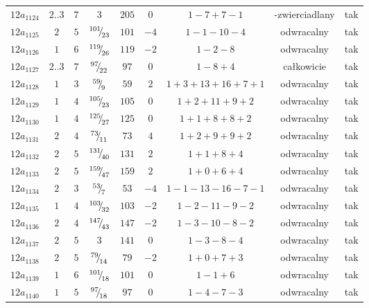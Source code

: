 \begin{longtable}{ccccccccc}
$12a_{1124}$ & $2..3$ & $7$ & $3$ & $205$ & $0$ & $1-7+7-1$ & -zwierciadlany & tak \\
$12a_{1125}$ & $2$ & $5$ & ${}^{101}{\mskip -5mu/\mskip -3mu}_{23}$ & $101$ & $-4$ & $1-1-10-4$ & odwracalny & tak \\
$12a_{1126}$ & $1$ & $6$ & ${}^{119}{\mskip -5mu/\mskip -3mu}_{26}$ & $119$ & $-2$ & $1-2-8$ & odwracalny & tak \\
$12a_{1127}$ & $2..3$ & $7$ & ${}^{97}{\mskip -5mu/\mskip -3mu}_{22}$ & $97$ & $0$ & $1-8+4$ & całkowicie & tak \\
$12a_{1128}$ & $1$ & $3$ & ${}^{59}{\mskip -5mu/\mskip -3mu}_{9}$ & $59$ & $2$ & $1+3+13+16+7+1$ & odwracalny & tak \\
$12a_{1129}$ & $1$ & $4$ & ${}^{105}{\mskip -5mu/\mskip -3mu}_{23}$ & $105$ & $0$ & $1+2+11+9+2$ & odwracalny & tak \\
$12a_{1130}$ & $1$ & $4$ & ${}^{125}{\mskip -5mu/\mskip -3mu}_{27}$ & $125$ & $0$ & $1+1+8+8+2$ & odwracalny & tak \\
$12a_{1131}$ & $2$ & $4$ & ${}^{73}{\mskip -5mu/\mskip -3mu}_{11}$ & $73$ & $4$ & $1+2+9+9+2$ & odwracalny & tak \\
$12a_{1132}$ & $2$ & $5$ & ${}^{131}{\mskip -5mu/\mskip -3mu}_{40}$ & $131$ & $2$ & $1+1+8+4$ & odwracalny & tak \\
$12a_{1133}$ & $2$ & $5$ & ${}^{159}{\mskip -5mu/\mskip -3mu}_{47}$ & $159$ & $2$ & $1+0+6+4$ & odwracalny & tak \\
$12a_{1134}$ & $2$ & $3$ & ${}^{53}{\mskip -5mu/\mskip -3mu}_{7}$ & $53$ & $-4$ & $1-1-13-16-7-1$ & odwracalny & tak \\
$12a_{1135}$ & $1$ & $4$ & ${}^{103}{\mskip -5mu/\mskip -3mu}_{32}$ & $103$ & $-2$ & $1-2-11-9-2$ & odwracalny & tak \\
$12a_{1136}$ & $2$ & $4$ & ${}^{147}{\mskip -5mu/\mskip -3mu}_{43}$ & $147$ & $-2$ & $1-3-10-8-2$ & odwracalny & tak \\
$12a_{1137}$ & $2$ & $5$ & $3$ & $141$ & $0$ & $1-3-8-4$ & odwracalny & tak \\
$12a_{1138}$ & $2$ & $5$ & ${}^{79}{\mskip -5mu/\mskip -3mu}_{14}$ & $79$ & $-2$ & $1+0+7+3$ & odwracalny & tak \\
$12a_{1139}$ & $1$ & $6$ & ${}^{101}{\mskip -5mu/\mskip -3mu}_{18}$ & $101$ & $0$ & $1-1+6$ & odwracalny & tak \\
$12a_{1140}$ & $1$ & $5$ & ${}^{97}{\mskip -5mu/\mskip -3mu}_{18}$ & $97$ & $0$ & $1-4-7-3$ & odwracalny & tak \\

\end{longtable}

